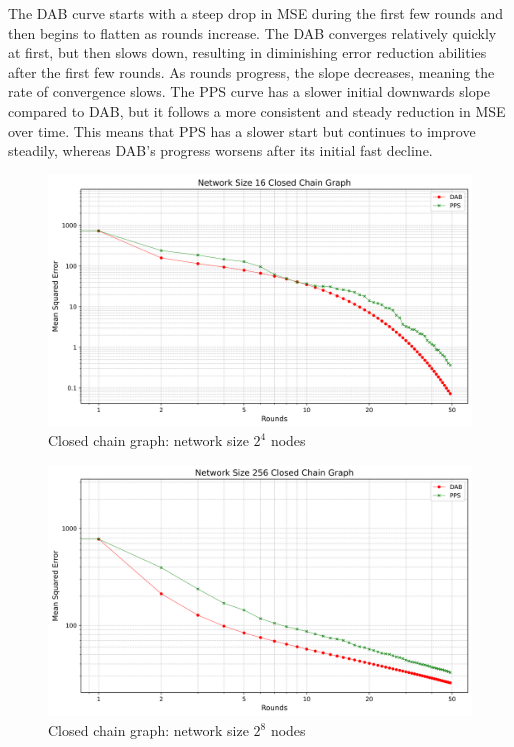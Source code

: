 The DAB curve starts with a steep drop in MSE during the first few rounds and then begins to flatten as rounds increase.
The DAB converges relatively quickly at first, but then slows down, resulting in diminishing error reduction abilities after the first few rounds. As rounds progress, the slope decreases, meaning the rate of convergence slows. The PPS curve has a slower initial downwards slope compared to DAB, but it follows a more consistent and steady reduction in MSE over time. This means that PPS has a slower start but continues to improve steadily, whereas DAB's progress worsens after its initial fast decline.
\begin{figure}[H]
    \centering
    \includegraphics[scale=0.5]{figures/closedChainSimulations/DAB_vs_PPS_CCG_r50_n16.png}
    \caption{Closed chain graph: network size $2^{4}$ nodes}
    \label{fig:16ChainGraph}
\end{figure}

\begin{figure}[H]
    \centering
    \includegraphics[scale=0.5]{figures/closedChainSimulations/DAB_vs_PPS_CCG_r50_n256.png}
    \caption{Closed chain graph: network size $2^{8}$ nodes}
    \label{fig:256ChainGraph}
\end{figure}

